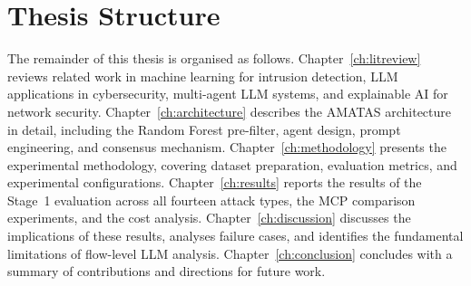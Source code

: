 \documentclass[../main.tex]{subfiles}
\begin{document}
\section{Thesis Structure}
\label{sec:thesis-structure}

The remainder of this thesis is organised as follows. Chapter~\ref{ch:litreview} reviews related work in machine learning for intrusion detection, LLM applications in cybersecurity, multi-agent LLM systems, and explainable AI for network security. Chapter~\ref{ch:architecture} describes the AMATAS architecture in detail, including the Random Forest pre-filter, agent design, prompt engineering, and consensus mechanism. Chapter~\ref{ch:methodology} presents the experimental methodology, covering dataset preparation, evaluation metrics, and experimental configurations. Chapter~\ref{ch:results} reports the results of the Stage~1 evaluation across all fourteen attack types, the MCP comparison experiments, and the cost analysis. Chapter~\ref{ch:discussion} discusses the implications of these results, analyses failure cases, and identifies the fundamental limitations of flow-level LLM analysis. Chapter~\ref{ch:conclusion} concludes with a summary of contributions and directions for future work.

\onlystandalone{\printbibliography}
\end{document}
